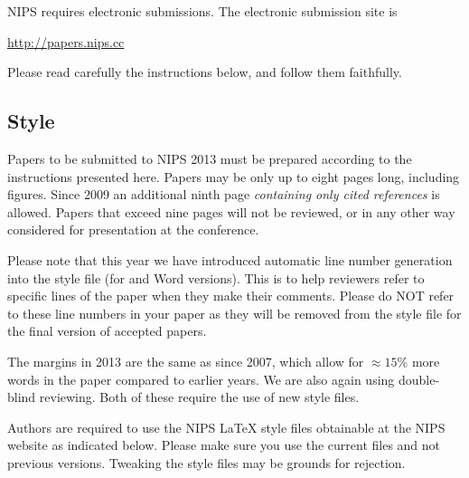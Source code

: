 \documentclass{article} %
\begin{document}
NIPS requires electronic submissions.  The electronic submission site is  
\begin{center}
   \url{http://papers.nips.cc}
\end{center}

Please read carefully the
instructions below, and follow them faithfully.
\subsection{Style}

Papers to be submitted to NIPS 2013 must be prepared according to the
instructions presented here. Papers may be only up to eight pages long,
including figures. Since 2009 an additional ninth page \textit{containing only
cited references} is allowed. Papers that exceed nine pages will not be
reviewed, or in any other way considered for presentation at the conference.

Please note that this year we have introduced automatic line number generation
into the style file (for \LaTeXe and Word versions). This is to help reviewers
refer to specific lines of the paper when they make their comments. Please do
NOT refer to these line numbers in your paper as they will be removed from the
style file for the final version of accepted papers.

The margins in 2013 are the same as since 2007, which allow for $\approx 15\%$
more words in the paper compared to earlier years. We are also again using 
double-blind reviewing. Both of these require the use of new style files.

Authors are required to use the NIPS \LaTeX{} style files obtainable at the
NIPS website as indicated below. Please make sure you use the current files and
not previous versions. Tweaking the style files may be grounds for rejection.



\end{document}

